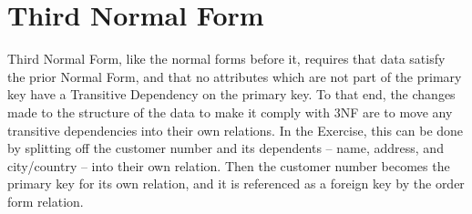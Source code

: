\documentclass{article}
\begin{document}
\section{Third Normal Form}

Third Normal Form, like the normal forms before it, requires that data
satisfy the prior Normal Form, and that no attributes which are not part
of the primary key have a Transitive Dependency on the primary key. To
that end, the changes made to the structure of the data to make it
comply with 3NF are to move any transitive dependencies into their own
relations. In the Exercise, this can be done by splitting off the
customer number and its dependents -- name, address, and city/country --
into their own relation. Then the customer number becomes the primary
key for its own relation, and it is referenced as a foreign key by the
order form relation.
\end{document}
